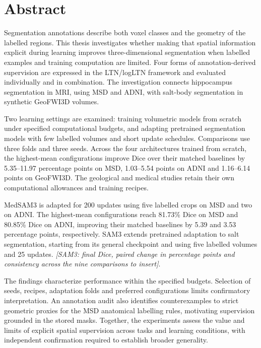 \documentclass[12pt,a4paper]{article}
\newcommand{\samResult}[1]{\textit{[SAM3: #1 to insert]}}
\begin{document}
\section*{Abstract}

Segmentation annotations describe both voxel classes and the geometry of
the labelled regions. This thesis investigates whether making that spatial
information explicit during learning improves three-dimensional
segmentation when labelled examples and training computation are limited.
Four forms of annotation-derived supervision are expressed in the
LTN/logLTN framework and evaluated individually and in combination.
The investigation connects hippocampus segmentation in MRI, using MSD
and ADNI, with salt-body segmentation in synthetic GeoFWI3D volumes.

Two learning settings are examined: training volumetric models from
scratch under specified computational budgets, and adapting pretrained
segmentation models with few labelled volumes and short update schedules.
Comparisons use three folds and three seeds. Across the four architectures
trained from scratch, the highest-mean configurations improve Dice over
their matched baselines by 5.35--11.97 percentage points on MSD,
1.03--5.54 points on ADNI and 1.16--6.14 points on GeoFWI3D.
The geological and medical studies retain their own computational
allowances and training recipes.

MedSAM3 is adapted for 200 updates using five labelled crops on MSD and
two on ADNI. The highest-mean configurations reach 81.73\% Dice on MSD
and 80.85\% Dice on ADNI,
improving their matched baselines by 5.39 and 3.53 percentage points,
respectively. SAM3 extends pretrained adaptation to salt segmentation,
starting from its general checkpoint and using five labelled volumes
and 25 updates. \samResult{final Dice, paired change in percentage
points and consistency across the nine comparisons}.

The findings characterize performance within the specified budgets.
Selection of seeds, recipes, adaptation folds and preferred configurations
limits confirmatory interpretation. An annotation audit also identifies
counterexamples to strict geometric proxies for the MSD anatomical
labelling rules, motivating supervision grounded in the stored masks.
Together, the experiments assess the value and limits of explicit spatial
supervision across tasks and learning conditions, with independent
confirmation required to establish broader generality.

\clearpage
\setcounter{tocdepth}{2}
\tableofcontents
\clearpage
\end{document}
